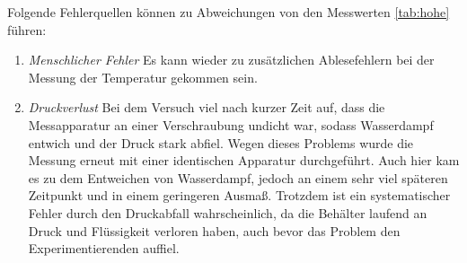 Folgende Fehlerquellen können zu Abweichungen von den Messwerten \ref{tab:hohe} führen:
\begin{enumerate}
  \item \textit{Menschlicher Fehler}
    Es kann wieder zu zusätzlichen Ablesefehlern bei der Messung der Temperatur gekommen sein.
  \item \textit{Druckverlust}
    Bei dem Versuch viel nach kurzer Zeit auf, dass die Messapparatur an einer Verschraubung undicht war,
    sodass Wasserdampf entwich und der Druck stark abfiel. Wegen dieses Problems wurde die Messung
    erneut mit einer identischen Apparatur durchgeführt. Auch hier kam es zu dem Entweichen von Wasserdampf,
    jedoch an einem sehr viel späteren Zeitpunkt und in einem geringeren Ausmaß. Trotzdem ist ein systematischer
    Fehler durch den Druckabfall wahrscheinlich, da die Behälter laufend an Druck und Flüssigkeit verloren haben, auch
    bevor das Problem den Experimentierenden auffiel.
\end{enumerate}
